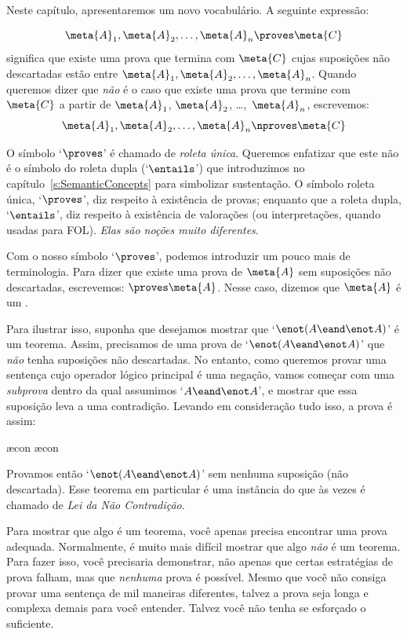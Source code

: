  Neste capítulo, apresentaremos um novo vocabulário. A seguinte expressão:
 
$$\meta{A}_1, \meta{A}_2, \ldots, \meta{A}_n \proves \meta{C}$$
significa que existe uma prova que termina com $\meta{C}$  cujas suposições não descartadas estão entre $\meta{A}_1, \meta{A}_2, \ldots, \meta{A}_n$. Quando queremos dizer que  \emph{não} é o caso que existe uma prova que termine com $\meta{C}$ a partir de $\meta{A}_1$, $\meta{A}_2$, \dots,~$\meta{A}_n$, escrevemos:  $$\meta{A}_1, \meta{A}_2, \ldots, \meta{A}_n \nproves \meta{C}$$  

O símbolo `$\proves$'  é chamado de  \emph{roleta única}. Queremos enfatizar que este não é o símbolo do roleta dupla (`$\entails$') que introduzimos no capítulo~\ref{s:SemanticConcepts}  para simbolizar sustentação. O símbolo roleta única, `$\proves$', diz respeito à existência de provas; enquanto que a roleta dupla, `$\entails$', diz respeito à existência de valorações (ou interpretações, quando usadas para FOL). \emph{Elas são noções muito diferentes}.

Com o nosso símbolo  `$\proves$',  podemos introduzir um pouco mais de terminologia. Para dizer que existe uma prova de $\meta{A}$ sem suposições não descartadas, escrevemos: ${} \proves \meta{A}$. Nesse caso, dizemos que $\meta{A}$ é um .

Para ilustrar isso, suponha que desejamos mostrar que `$\enot (A \eand \enot A)$' é um teorema. Assim, precisamos de uma prova de `$\enot(A \eand \enot A)$' que \emph{não} tenha suposições não descartadas. No entanto, como queremos provar uma sentença cujo operador lógico principal é uma negação, vamos começar com uma \emph{subprova}  dentro da qual assumimos `$A \eand \enot A$', e mostrar que essa suposição leva a uma contradição. Levando em consideração tudo isso, a prova é assim:
	\begin{fitchproof}
		\open
			\ae{con}
			\ae{con}
		\close
	\end{fitchproof}
Provamos então `$\enot (A \eand \enot A)$' sem nenhuma suposição (não descartada).  Esse teorema em particular é uma instância do que às vezes é chamado de \emph{Lei da Não Contradição}.

Para mostrar que algo é um teorema, você apenas precisa encontrar uma prova adequada. Normalmente, é muito mais difícil mostrar que algo \emph{não} é um teorema. Para fazer isso, você precisaria demonstrar, não apenas que certas estratégias de prova falham, mas que \emph{nenhuma} prova é possível. Mesmo que você não consiga provar uma sentença de mil maneiras diferentes, talvez a prova seja longa e complexa demais para você entender. Talvez você não tenha se esforçado o suficiente.

